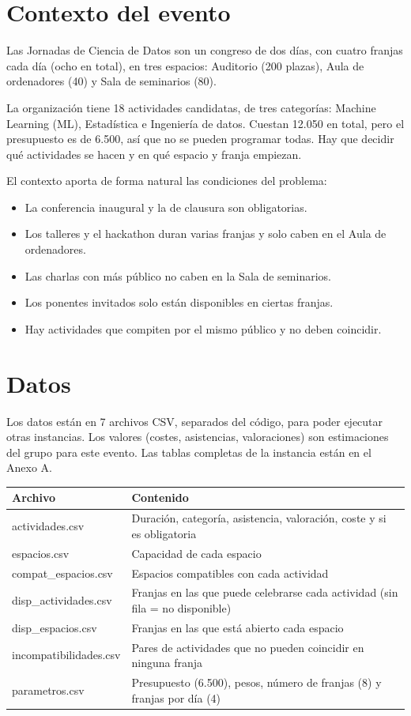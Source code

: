 \section{Contexto del evento}
Las Jornadas de Ciencia de Datos son un congreso de dos d\'ias, con cuatro franjas cada d\'ia (ocho en total), en tres espacios: Auditorio (200 plazas), Aula de ordenadores (40) y Sala de seminarios (80).

La organizaci\'on tiene 18 actividades candidatas, de tres categor\'ias: Machine Learning (ML), Estad\'istica e Ingenier\'ia de datos. Cuestan 12.050 en total, pero el presupuesto es de 6.500, as\'i que no se pueden programar todas. Hay que decidir qu\'e actividades se hacen y en qu\'e espacio y franja empiezan.

El contexto aporta de forma natural las condiciones del problema:
\begin{itemize}[nosep]
\item La conferencia inaugural y la de clausura son obligatorias.
\item Los talleres y el hackathon duran varias franjas y solo caben en el Aula de ordenadores.
\item Las charlas con m\'as p\'ublico no caben en la Sala de seminarios.
\item Los ponentes invitados solo est\'an disponibles en ciertas franjas.
\item Hay actividades que compiten por el mismo p\'ublico y no deben coincidir.
\end{itemize}

\section{Datos}
Los datos est\'an en 7 archivos CSV, separados del c\'odigo, para poder ejecutar otras instancias. Los valores (costes, asistencias, valoraciones) son estimaciones del grupo para este evento. Las tablas completas de la instancia est\'an en el Anexo A.

\begin{center}\small
\begin{tabular}{@{}ll@{}}\toprule
Archivo & Contenido\\\midrule
actividades.csv & Duraci\'on, categor\'ia, asistencia, valoraci\'on, coste y si es obligatoria\\
espacios.csv & Capacidad de cada espacio\\
compat\_espacios.csv & Espacios compatibles con cada actividad\\
disp\_actividades.csv & Franjas en las que puede celebrarse cada actividad (sin fila = no disponible)\\
disp\_espacios.csv & Franjas en las que est\'a abierto cada espacio\\
incompatibilidades.csv & Pares de actividades que no pueden coincidir en ninguna franja\\
parametros.csv & Presupuesto (6.500), pesos, n\'umero de franjas (8) y franjas por d\'ia (4)\\\bottomrule
\end{tabular}\end{center}


